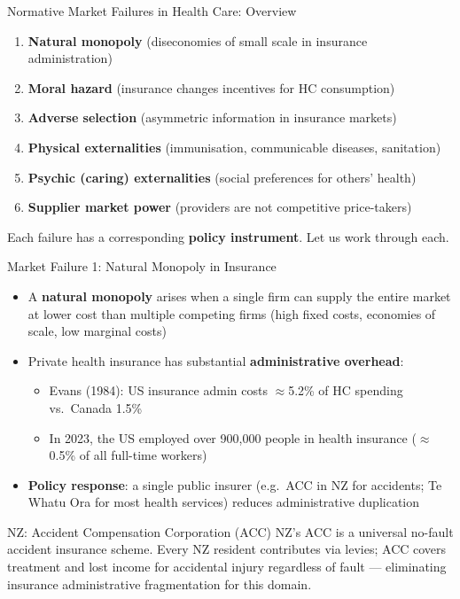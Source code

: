 \documentclass[aspectratio=169, 12pt]{beamer}
\begin{document}
\begin{frame}{Normative Market Failures in Health Care: Overview}
  \begin{enumerate}
    \item \textbf{Natural monopoly} (diseconomies of small scale in insurance administration)
    \item \textbf{Moral hazard} (insurance changes incentives for HC consumption)
    \item \textbf{Adverse selection} (asymmetric information in insurance markets)
    \item \textbf{Physical externalities} (immunisation, communicable diseases, sanitation)
    \item \textbf{Psychic (caring) externalities} (social preferences for others' health)
    \item \textbf{Supplier market power} (providers are not competitive price-takers)
  \end{enumerate}
  \vspace{0.4em}
  Each failure has a corresponding \textbf{policy instrument}. Let us work through each.
\end{frame}

\begin{frame}{Market Failure 1: Natural Monopoly in Insurance}
  \begin{itemize}
    \item A \textbf{natural monopoly} arises when a single firm can supply the entire market at
          lower cost than multiple competing firms (high fixed costs, economies of scale,
          low marginal costs)
    \item Private health insurance has substantial \textbf{administrative overhead}:
    \begin{itemize}
      \item Evans (1984): US insurance admin costs $\approx$5.2\% of HC spending vs.\ Canada 1.5\%
      \item In 2023, the US employed over 900,000 people in health insurance ($\approx$0.5\% of
            all full-time workers)
    \end{itemize}
    \item \textbf{Policy response}: a single public insurer (e.g.\ ACC in NZ for accidents;
          Te Whatu Ora for most health services) reduces administrative duplication
  \end{itemize}
  \begin{exampleblock}{NZ: Accident Compensation Corporation (ACC)}
    NZ's ACC is a universal no-fault accident insurance scheme. Every NZ resident contributes via
    levies; ACC covers treatment and lost income for accidental injury regardless of fault ---
    eliminating insurance administrative fragmentation for this domain.
  \end{exampleblock}
\end{frame}
\end{document}
